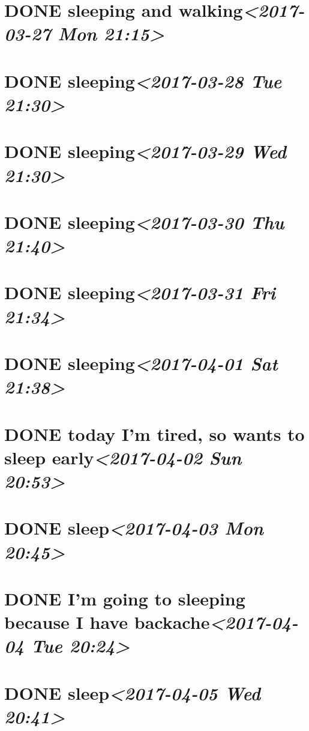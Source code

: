 \documentclass[cyan]{elegantnote}
\begin{document}
\section{{\bfseries\sffamily DONE} sleeping and walking\textit{<2017-03-27 Mon 21:15>}}
\label{sec:org544d427}
\section{{\bfseries\sffamily DONE} sleeping\textit{<2017-03-28 Tue 21:30>}}
\label{sec:org64c1524}
\section{{\bfseries\sffamily DONE} sleeping\textit{<2017-03-29 Wed 21:30>}}
\label{sec:org11685e4}
\section{{\bfseries\sffamily DONE} sleeping\textit{<2017-03-30 Thu 21:40>}}
\label{sec:org07fdaca}
\section{{\bfseries\sffamily DONE} sleeping\textit{<2017-03-31 Fri 21:34>}}
\label{sec:org2c28a58}
\section{{\bfseries\sffamily DONE} sleeping\textit{<2017-04-01 Sat 21:38>}}
\label{sec:orgf2abd25}
\section{{\bfseries\sffamily DONE} today I'm tired, so wants to sleep early\textit{<2017-04-02 Sun 20:53>}}
\label{sec:org9f18119}
\section{{\bfseries\sffamily DONE} sleep\textit{<2017-04-03 Mon 20:45>}}
\label{sec:org5194618}
\section{{\bfseries\sffamily DONE} I'm going to sleeping because I have backache\textit{<2017-04-04 Tue 20:24>}}
\label{sec:org38fc1c3}
\section{{\bfseries\sffamily DONE} sleep\textit{<2017-04-05 Wed 20:41>}}
\label{sec:org757f407}
\end{document}

